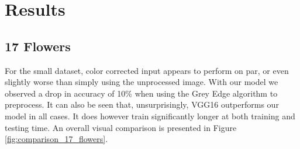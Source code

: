 \section{Results}

\subsection{17 Flowers}

For the small dataset, color corrected input appears to perform on par, or even slightly worse than simply using the unprocessed image.
With our model we observed a drop in accuracy of 10\% when using the Grey Edge algorithm to preprocess. It can also be seen that,
unsurprisingly, VGG16 outperforms our model in all cases. It does however train significantly longer at both training and testing time.
An overall visual comparison is presented in Figure \ref{fig:comparison_17_flowers}.

